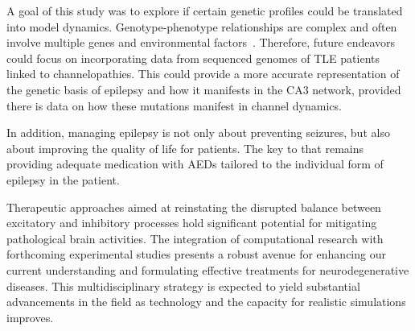 A goal of this study was to explore if certain genetic profiles could be translated into model dynamics.
Genotype-phenotype relationships are complex and often involve multiple genes and environmental factors~\parencite{steriadeEpilepsyKeyExperimental2020}.
Therefore, future endeavors could focus on incorporating data from sequenced genomes of TLE patients linked to channelopathies.
This could provide a more accurate representation of the genetic basis of epilepsy and how it manifests in the CA3 network,
provided there is data on how these mutations manifest in channel dynamics.

In addition, managing epilepsy is not only about preventing seizures, but also about improving the quality of life for patients.
The key to that remains providing adequate medication with AEDs tailored to the individual form of epilepsy in the patient.

Therapeutic approaches aimed at reinstating the disrupted balance between excitatory and inhibitory processes hold significant potential for mitigating pathological brain activities.
The integration of computational research with forthcoming experimental studies presents a robust avenue for enhancing our current understanding and formulating effective treatments for neurodegenerative diseases.
This multidisciplinary strategy is expected to yield substantial advancements in the field as technology and the capacity for realistic simulations improves.
